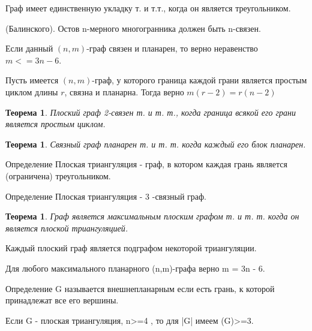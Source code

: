 \documentclass[a4paper,openany]{book}
\newcounter{TheoremCounter}
\newtheorem{theorem}[TheoremCounter]{Теорема}
\newenvironment{definition}
{\begin{statement}{Определение}}
    {\end{statement}}
\begin{document}
\begin{consequences}
  \item Граф имеет единственную укладку т. и т.т., когда он является треугольником.
  \item (Балинского). Остов n-мерного многогранника должен быть n-связен.
  \item Если данный $(n,m)$-граф связен и планарен, то верно неравенство
  $m <= 3n - 6$.
  \item Пусть имеется $(n,m)$-граф, у которого граница каждой грани является
  простым циклом длины $r$, связна и планарна. Тогда верно $m(r - 2)=r(n - 2)$
\end{consequences}

\begin{theorem}
  Плоский граф 2-связен т. и т. т., когда граница всякой его грани является простым циклом.
\end{theorem}

\begin{theorem}
  Связный граф планарен т. и т. т. когда каждый его блок планарен.
\end{theorem}

\begin{definition}
  Плоская триангуляция - граф, в котором каждая грань является (ограничена) треугольником.
\end{definition}

\begin{definition}
  Плоская триангуляция - $3$ -связный граф.
\end{definition}

\begin{theorem}
  Граф является максимальным плоским графом т. и т. т. когда он является плоской триангуляцией.
\end{theorem}

\begin{consequences}
  \item Каждый плоский граф является подграфом некоторой триангуляции.
  \item Для любого максимального планарного (n,m)-графа верно m = 3n - 6.
\end{consequences}

\begin{definition}
  G называется внешнепланарным если есть грань, к которой принадлежат все его вершины.
\end{definition}

\begin{stm}
  Если G - плоская триангуляция, n>=4 , то для |G| имеем (G)>=3.
\end{stm}
\end{document}
